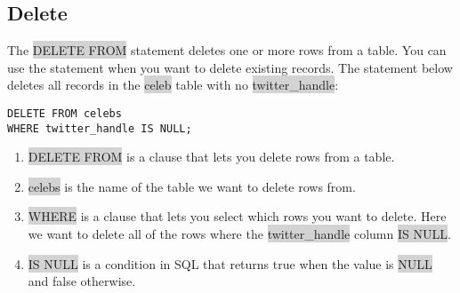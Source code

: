 \documentclass[11pt]{article}
\begin{document}
\subsection{Delete}
The \colorbox{lightgray}{DELETE FROM} statement deletes one or more rows from a table. You can use the statement when you want to delete existing records. The statement below deletes all records in the \colorbox{lightgray}{celeb} table with no \colorbox{lightgray}{twitter\_handle}:
\begin{lstlisting}
DELETE FROM celebs 
WHERE twitter_handle IS NULL;
\end{lstlisting}
\begin{enumerate}[leftmargin = *]
\item \colorbox{lightgray}{DELETE FROM} is a clause that lets you delete rows from a table.
\item \colorbox{lightgray}{celebs} is the name of the table we want to delete rows from.
\item \colorbox{lightgray}{WHERE} is a clause that lets you select which rows you want to delete. Here we want to delete all of the rows where the \colorbox{lightgray}{twitter\_handle} column \colorbox{lightgray}{IS NULL}.
\item \colorbox{lightgray}{IS NULL} is a condition in SQL that returns true when the value is \colorbox{lightgray}{NULL} and false otherwise.
\end{enumerate}
\end{document}
